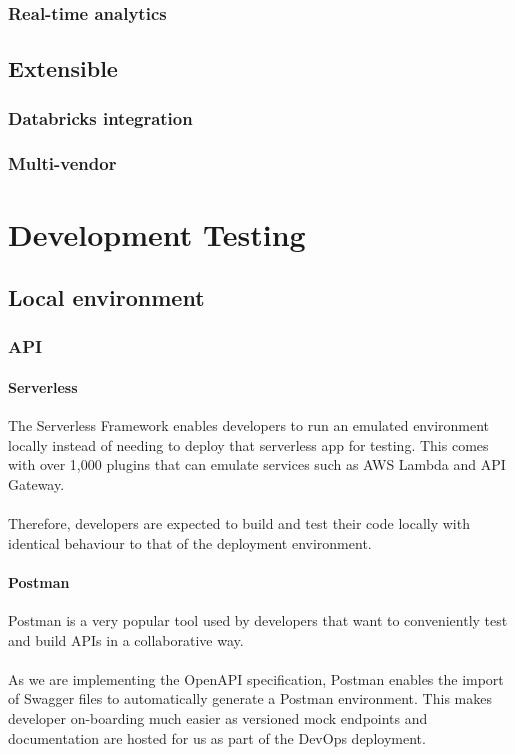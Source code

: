 \documentclass[10pt]{article}
\begin{document}
\subsubsection{Real-time analytics}

\subsection{Extensible}
\subsubsection{Databricks integration}
\subsubsection{Multi-vendor}

\section{Development Testing}
\subsection{Local environment}

\subsubsection{API}
\paragraph{Serverless}
The Serverless Framework enables developers to run an emulated environment locally instead of needing to deploy that serverless app for testing. This comes with over 1,000 plugins that can emulate services such as AWS Lambda and API Gateway. 
\\ \\
Therefore, developers are expected to build and test their code locally with identical behaviour to that of the deployment environment.
\paragraph{Postman}

Postman is a very popular tool used by developers that want to conveniently test and build APIs in a collaborative way.
\\ \\
As we are implementing the OpenAPI specification, Postman enables the import of Swagger files to automatically generate a Postman environment. This makes developer on-boarding much easier as versioned mock endpoints and documentation are hosted for us as part of the DevOps deployment.
\end{document}
